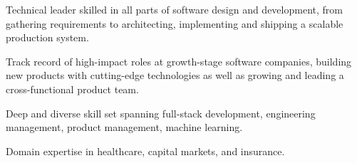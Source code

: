 

\begin{cvparagraph}

Technical leader skilled in all parts of software design and development, from gathering requirements to
architecting, implementing and shipping a scalable production system.

Track record of high-impact roles at growth-stage software companies, building new products
with cutting-edge technologies as well as growing and leading a cross-functional product team.

Deep and diverse skill set spanning full-stack development, engineering management, product management, machine learning.

Domain expertise in healthcare, capital markets, and insurance.
\end{cvparagraph}
